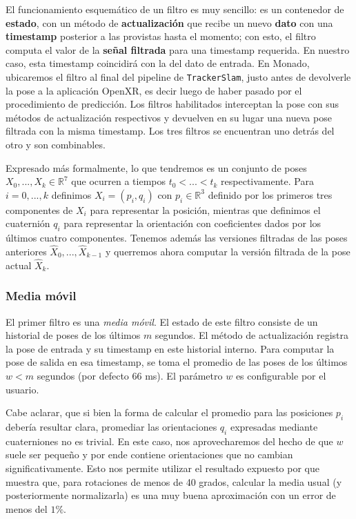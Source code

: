 \documentclass[ twoside,openright,titlepage,numbers=noenddot,%
                headinclude,footinclude,cleardoublepage=empty,abstract=on,
                BCOR=-5mm,paper=a4,fontsize=11pt
                ]{scrreprt}
\newcommand{\R}{\mathbb{R}}
\newcommand{\passthrough}[1]{#1}
\begin{document}
El funcionamiento esquemático de un filtro es muy sencillo: es un
contenedor de \textbf{estado}, con un método de \textbf{actualización}
que recibe un nuevo \textbf{dato} con una \textbf{timestamp} posterior a
las provistas hasta el momento; con esto, el filtro computa el valor de
la \textbf{señal filtrada} para una timestamp requerida. En nuestro
caso, esta timestamp coincidirá con la del dato de entrada. En Monado,
ubicaremos el filtro al final del pipeline de
\passthrough{\lstinline!TrackerSlam!}, justo antes de devolverle la pose
a la aplicación OpenXR, es decir luego de haber pasado por el
procedimiento de predicción. Los filtros habilitados interceptan la pose
con sus métodos de actualización respectivos y devuelven en su lugar una
nueva pose filtrada con la misma timestamp. Los tres filtros se
encuentran uno detrás del otro y son combinables.

Expresado más formalmente, lo que tendremos es un conjunto de poses
\(X_0, ..., X_k \in \R^7\) que ocurren a tiempos \(t_0 < ... < t_k\)
respectivamente. Para \(i = 0, ..., k\) definimos \(X_i = (p_i, q_i)\)
con \(p_i \in \R^3\) definido por los primeros tres componentes de
\(X_i\) para representar la posición, mientras que definimos el
cuaternión \(q_i\) para representar la orientación con coeficientes
dados por los últimos cuatro componentes. Tenemos además las versiones
filtradas de las poses anteriores \(\hat{X}_0, ..., \hat{X}_{k - 1}\) y
querremos ahora computar la versión filtrada de la pose actual
\(\hat{X}_k\).

\hypertarget{media-muxf3vil}{%
\subsubsection{Media móvil}\label{media-muxf3vil}}

El primer filtro es una \emph{media móvil}. El estado de este filtro
consiste de un historial de poses de los últimos \(m\) segundos. El
método de actualización registra la pose de entrada y su timestamp en
este historial interno. Para computar la pose de salida en esa
timestamp, se toma el promedio de las poses de los últimos \(w < m\)
segundos (por defecto 66 ms). El parámetro \(w\) es configurable por el
usuario.

Cabe aclarar, que si bien la forma de calcular el promedio para las
posiciones \(p_i\) debería resultar clara, promediar las orientaciones
\(q_i\) expresadas mediante cuaterniones no es trivial. En este caso,
nos aprovecharemos del hecho de que \(w\) suele ser pequeño y por ende
contiene orientaciones que no cambian significativamente. Esto nos
permite utilizar el resultado expuesto por
\textcite{gramkowAveragingRotations2001} que muestra que, para
rotaciones de menos de 40 grados, calcular la media usual (y
posteriormente normalizarla) es una muy buena aproximación con un error
de menos del \(1\%\).
\end{document}
